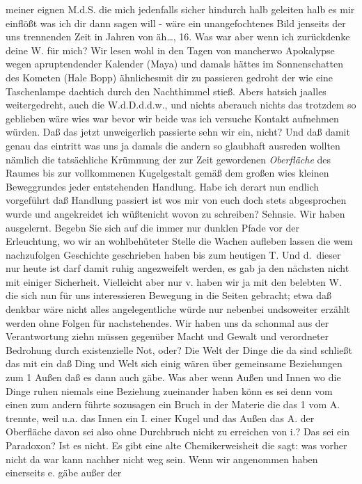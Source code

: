 \documentclass[
]{article}
\begin{document}
meiner eignen M.d.S. die mich jedenfalls sicher hindurch halb geleiten
halb es mir einflößt was ich dir dann sagen will - wäre ein
unangefochtenes Bild jenseits der uns trennenden Zeit in Jahren von
äh\ldots, 16. Was war aber wenn ich zurückdenke deine W. für mich? Wir
lesen wohl in den Tagen von mancherwo Apokalypse wegen apruptendender
Kalender (Maya) und damals hättes im Sonnenschatten des Kometen (Hale
Bopp) ähnlichesmit dir zu passieren gedroht der wie eine Taschenlampe
dachtich durch den Nachthimmel stieß. Abers hatsich jaalles
weitergedreht, auch die W.d.D.d.d.w., und nichts aberauch nichts das
trotzdem so geblieben wäre wies war bevor wir beide was ich versuche
Kontakt aufnehmen würden. Daß das jetzt unweigerlich passierte sehn wir
ein, nicht? Und daß damit genau das eintritt was uns ja damals die
andern so glaubhaft ausreden wollten nämlich die tatsächliche Krümmung
der zur Zeit gewordenen \emph{Oberfläche} des Raumes bis zur
vollkommenen Kugelgestalt gemäß dem großen wies kleinen Beweggrundes
jeder entstehenden Handlung. Habe ich derart nun endlich vorgeführt daß
Handlung passiert ist wos mir von euch doch stets abgesprochen wurde und
angekreidet ich wüßtenicht wovon zu schreiben? Sehnsie. Wir haben
ausgelernt. Begebn Sie sich auf die immer nur dunklen Pfade vor der
Erleuchtung, wo wir an wohlbehüteter Stelle die Wachen aufleben lassen
die wem nachzufolgen Geschichte geschrieben haben bis zum heutigen T.
Und d.~dieser nur heute ist darf damit ruhig angezweifelt werden, es gab
ja den nächsten nicht mit einiger Sicherheit. Vielleicht aber nur v.
haben wir ja mit den belebten W. die sich nun für uns interessieren
Bewegung in die Seiten gebracht; etwa daß denkbar wäre nicht alles
angelegentliche würde nur nebenbei undsoweiter erzählt werden ohne
Folgen für nachstehendes. Wir haben uns da schonmal aus der
Verantwortung ziehn müssen gegenüber Macht und Gewalt und verordneter
Bedrohung durch existenzielle Not, oder? Die Welt der Dinge die da sind
schließt das mit ein daß Ding und Welt sich einig wären über gemeinsame
Beziehungen zum 1 Außen daß es dann auch gäbe. Was aber wenn Außen und
Innen wo die Dinge ruhen niemals eine Beziehung zueinander haben könn es
sei denn vom einen zum andern führte sozusagen ein Bruch in der Materie
die das 1 vom A. trennte, weil u.a. das Innen ein I. einer Kugel und das
Außen das A. der Oberfläche davon sei also ohne Durchbruch nicht zu
erreichen von i.? Das sei ein Paradoxon? Ist es nicht. Es gibt eine alte
Chemikerweisheit die sagt: was vorher nicht da war kann nachher nicht
weg sein. Wenn wir angenommen haben einerseits e. gäbe außer der
\end{document}
